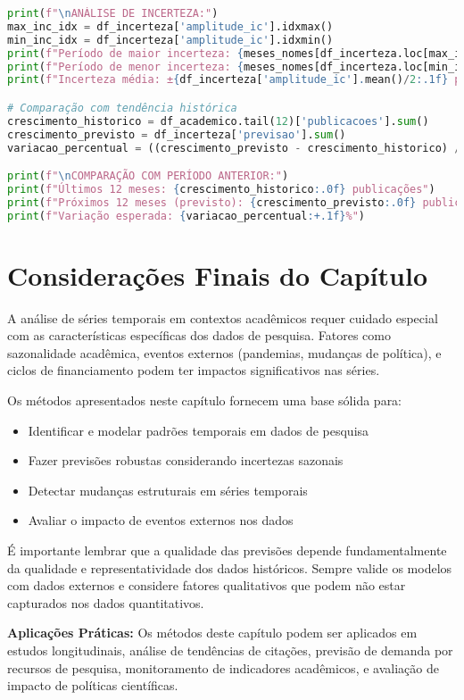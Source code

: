 \begin{pythonbox}
\begin{lstlisting}[language=Python]
print(f"\nANÁLISE DE INCERTEZA:")
max_inc_idx = df_incerteza['amplitude_ic'].idxmax()
min_inc_idx = df_incerteza['amplitude_ic'].idxmin()
print(f"Período de maior incerteza: {meses_nomes[df_incerteza.loc[max_inc_idx, 'mes']-1]}")
print(f"Período de menor incerteza: {meses_nomes[df_incerteza.loc[min_inc_idx, 'mes']-1]}")
print(f"Incerteza média: ±{df_incerteza['amplitude_ic'].mean()/2:.1f} publicações")

# Comparação com tendência histórica
crescimento_historico = df_academico.tail(12)['publicacoes'].sum()
crescimento_previsto = df_incerteza['previsao'].sum()
variacao_percentual = ((crescimento_previsto - crescimento_historico) / crescimento_historico) * 100

print(f"\nCOMPARAÇÃO COM PERÍODO ANTERIOR:")
print(f"Últimos 12 meses: {crescimento_historico:.0f} publicações")
print(f"Próximos 12 meses (previsto): {crescimento_previsto:.0f} publicações")
print(f"Variação esperada: {variacao_percentual:+.1f}%")
\end{lstlisting}
\end{pythonbox}

\section{Considerações Finais do Capítulo}

A análise de séries temporais em contextos acadêmicos requer cuidado especial com as características específicas dos dados de pesquisa. Fatores como sazonalidade acadêmica, eventos externos (pandemias, mudanças de política), e ciclos de financiamento podem ter impactos significativos nas séries.

Os métodos apresentados neste capítulo fornecem uma base sólida para:

\begin{itemize}
\item Identificar e modelar padrões temporais em dados de pesquisa
\item Fazer previsões robustas considerando incertezas sazonais
\item Detectar mudanças estruturais em séries temporais
\item Avaliar o impacto de eventos externos nos dados
\end{itemize}

É importante lembrar que a qualidade das previsões depende fundamentalmente da qualidade e representatividade dos dados históricos. Sempre valide os modelos com dados externos e considere fatores qualitativos que podem não estar capturados nos dados quantitativos.

\begin{researchbox}
\textbf{Aplicações Práticas:} Os métodos deste capítulo podem ser aplicados em estudos longitudinais, análise de tendências de citações, previsão de demanda por recursos de pesquisa, monitoramento de indicadores acadêmicos, e avaliação de impacto de políticas científicas.
\end{researchbox}